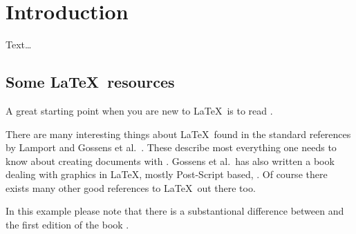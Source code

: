 \chapter{Introduction}
\label{sec:introduction}

Text\dots

\section{Some \LaTeX\ resources}
\label{sec:section1}

A great starting point when you are new to \LaTeX\ is to read
\cite{oetikerPHS:2004}.

There are many interesting things about \LaTeX\ found in the standard
references by Lamport \cite{lamport:1994} and Gossens et al.\
\cite{companion:2004}. These describe most everything one needs to
know about creating documents with \LaTeXe.  Gossens et al.\ has also
written a book dealing with graphics in \LaTeX, mostly Post-Script
based, \cite{companionG:1997}. Of course there exists many other good
references to \LaTeX\ out there too.

\begin{example}
  In this example please note that there is a substantional difference
  between \cite{companion:2004} and the first edition of the book
  \cite{companion:1994}.
\end{example}

